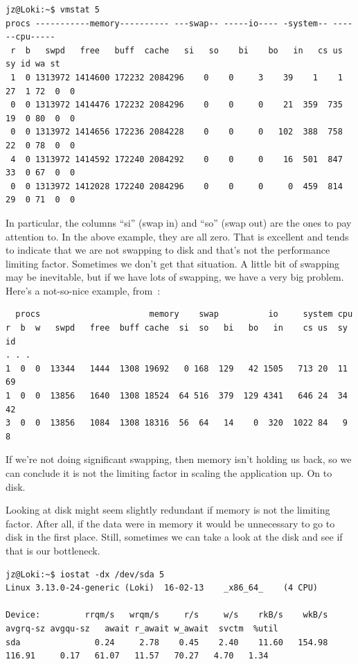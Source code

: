 \documentclass[a4paper]{report}
\begin{document}
\begin{verbatim}
jz@Loki:~$ vmstat 5
procs -----------memory---------- ---swap-- -----io---- -system-- ------cpu-----
 r  b   swpd   free   buff  cache   si   so    bi    bo   in   cs us sy id wa st
 1  0 1313972 1414600 172232 2084296    0    0     3    39    1    1 27  1 72  0  0
 0  0 1313972 1414476 172232 2084296    0    0     0    21  359  735 19  0 80  0  0
 0  0 1313972 1414656 172236 2084228    0    0     0   102  388  758 22  0 78  0  0
 4  0 1313972 1414592 172240 2084292    0    0     0    16  501  847 33  0 67  0  0
 0  0 1313972 1412028 172240 2084296    0    0     0     0  459  814 29  0 71  0  0
\end{verbatim}

In particular, the columns ``si'' (swap in) and ``so'' (swap out) are the ones to pay attention to. In the above example, they are all zero. That is excellent and tends to indicate that we are not swapping to disk and that's not the performance limiting factor. Sometimes we don't get that situation. A little bit of swapping may be inevitable, but if we have lots of swapping, we have a very big problem. Here's a not-so-nice example, from~\cite{vmstat}:

\begin{verbatim}
  procs                      memory    swap          io     system cpu
r  b  w   swpd   free  buff cache  si  so   bi   bo   in    cs us  sy  id
. . .
1  0  0  13344   1444  1308 19692   0 168  129   42 1505   713 20  11  69
1  0  0  13856   1640  1308 18524  64 516  379  129 4341   646 24  34  42
3  0  0  13856   1084  1308 18316  56  64   14    0  320  1022 84   9   8
\end{verbatim}

If we're not doing significant swapping, then memory isn't holding us back, so we can conclude it is not the limiting factor in scaling the application up. On to disk.

Looking at disk might seem slightly redundant if memory is not the limiting factor. After all, if the data were in memory it would be unnecessary to go to disk in the first place. Still, sometimes we can take a look at the disk and see if that is our bottleneck.

{\scriptsize
\begin{verbatim}
jz@Loki:~$ iostat -dx /dev/sda 5 
Linux 3.13.0-24-generic (Loki) 	16-02-13 	_x86_64_	(4 CPU)

Device:         rrqm/s   wrqm/s     r/s     w/s    rkB/s    wkB/s avgrq-sz avgqu-sz   await r_await w_await  svctm  %util
sda               0.24     2.78    0.45    2.40    11.60   154.98   116.91     0.17   61.07   11.57   70.27   4.70   1.34
\end{verbatim}
}
\end{document}

